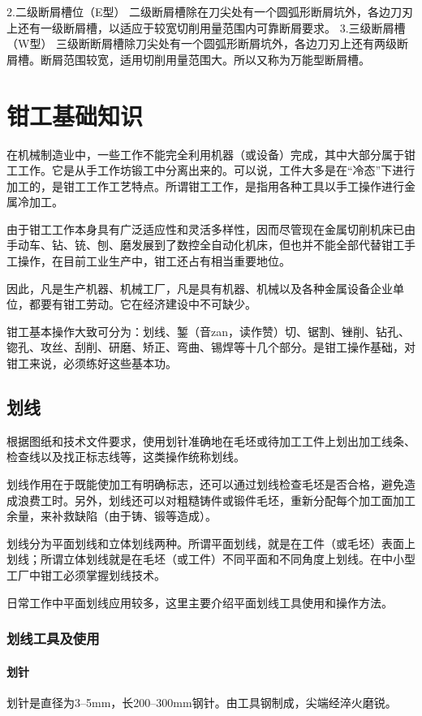 \documentclass{ctexbook}
\begin{document}
2.二级断屑槽位（E型）
二级断屑槽除在刀尖处有一个圆弧形断屑坑外，各边刀刃上还有一级断屑槽，以适应于较宽切削用量范围内可靠断屑要求。
3.三级断屑槽（W型）
三级断断屑槽除刀尖处有一个圆弧形断屑坑外，各边刀刃上还有两级断屑槽。断屑范围较宽，适用切削用量范围大。所以又称为万能型断屑槽。
\chapter{钳工基础知识}
在机械制造业中，一些工作不能完全利用机器（或设备）完成，其中大部分属于钳工工作。它是从手工作坊锻工中分离出来的。可以说，工件大多是在“冷态”下进行加工的，是钳工工作工艺特点。所谓钳工工作，是指用各种工具以手工操作进行金属冷加工。

由于钳工工作本身具有广泛适应性和灵活多样性，因而尽管现在金属切削机床已由手动车、钻、铳、刨、磨发展到了数控全自动化机床，但也并不能全部代替钳工手工操作，在目前工业生产中，钳工还占有相当重要地位。

因此，凡是生产机器、机械工厂，凡是具有机器、机械以及各种金属设备企业单位，都要有钳工劳动。它在经济建设中不可缺少。

钳工基本操作大致可分为：划线、錾（音zan，读作赞）切、锯割、锉削、钻孔、锪孔、攻丝、刮削、研磨、矫正、弯曲、锡焊等十几个部分。是钳工操作基础，对钳工来说，必须练好这些基本功。
\section{划线}
根据图纸和技术文件要求，使用划针准确地在毛坯或待加工工件上划出加工线条、检查线以及找正标志线等，这类操作统称划线。

划线作用在于既能使加工有明确标志，还可以通过划线检查毛坯是否合格，避免造成浪费工时。另外，划线还可以对粗糙铸件或锻件毛坯，重新分配每个加工面加工余量，来补救缺陷（由于铸、锻等造成）。

划线分为平面划线和立体划线两种。所谓平面划线，就是在工件（或毛坯）表面上划线；所谓立体划线就是在毛坯（或工件）不同平面和不同角度上划线。在中小型工厂中钳工必须掌握划线技术。

日常工作中平面划线应用较多，这里主要介绍平面划线工具使用和操作方法。
\subsection{划线工具及使用}
\subsubsection{划针}
划针是直径为3--5mm，长200--300mm钢针。由工具钢制成，尖端经淬火磨锐。
\end{document}
